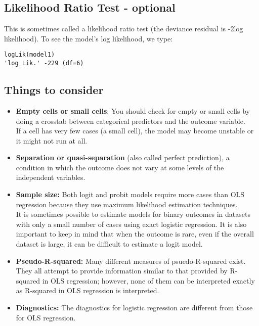 \documentclass[]{article}
\begin{document}
\subsection{Likelihood Ratio Test - optional}
This is sometimes called a likelihood ratio test (the deviance residual is -2log likelihood). To see the model's log likelihood, we type:
\begin{verbatim}
logLik(model1)
'log Lik.' -229 (df=6)
\end{verbatim}
\newpage
\subsection{Things to consider}
\begin{itemize}
\item \textbf{Empty cells or small cells}: You should check for empty or small cells by doing a crosstab between categorical predictors and the outcome variable.\\ If a cell has very few cases (a small cell), the model may become unstable or it might not run at all.
\item \textbf{Separation or quasi-separation} (also called perfect prediction), a condition in which the outcome does not vary at some levels of the independent variables. 
\item 
\textbf{Sample size:} Both logit and probit models require more cases than OLS regression because they use maximum likelihood estimation techniques. \\ It is sometimes possible to estimate models for binary outcomes in datasets with only a small number of cases using exact logistic regression. It is also important to keep in mind that when the outcome is rare, even if the overall dataset is large, it can be difficult to estimate a logit model.
\item \textbf{Pseudo-R-squared:} Many different measures of psuedo-R-squared exist. \\ They all attempt to provide information similar to that provided by R-squared in OLS regression; however, none of them can be interpreted exactly as R-squared in OLS regression is interpreted.
\item \textbf{Diagnostics:} The diagnostics for logistic regression are different from those for OLS regression. 
\end{itemize}
\end{document}
